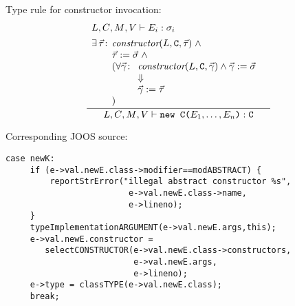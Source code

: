 \begin{slide*}
Type rule for constructor invocation:
\renewcommand{\arraystretch}{0.95}
$$ \frac{\begin{array}{l}
      \mbox{$L$}{},\mbox{$C$}{},\mbox{$M$}{},\mbox{$V$}{} \vdash E_i: \sigma_i\\[1ex]
      \exists\, \vec{\tau}\!:\!\!\begin{array}[t]{l}\mbox{\em constructor}(\mbox{$L$}{},\mbox{\tt C},\vec{\tau})\; \wedge\\
              \vec{\tau}:=\vec{\sigma}\; \wedge\\
              (\forall \vec{\gamma}\!:\begin{array}[t]{l}\mbox{\em constructor}(\mbox{$L$}{},\mbox{\tt C},\vec{\gamma}) \wedge \vec{\gamma}:=\vec{\sigma}\\
                       \Downarrow \\ \vec{\gamma}:=\vec{\tau}\end{array}\\)\end{array}\\
   \end{array}}{
       \mbox{$L$}{},\mbox{$C$}{},\mbox{$M$}{},\mbox{$V$}{} \vdash \mbox{\tt new C(}E_1,\ldots,E_n\mbox{\tt )}: \mbox{\tt C}
   }
$$
\renewcommand{\arraystretch}{1}

Corresponding JOOS source:

\begin{scriptsize}
\begin{verbatim}
case newK:
     if (e->val.newE.class->modifier==modABSTRACT) {
         reportStrError("illegal abstract constructor %s",
                         e->val.newE.class->name,
                         e->lineno);
     }
     typeImplementationARGUMENT(e->val.newE.args,this);
     e->val.newE.constructor = 
        selectCONSTRUCTOR(e->val.newE.class->constructors,
                          e->val.newE.args,
                          e->lineno);
     e->type = classTYPE(e->val.newE.class);
     break;

\end{verbatim}
\end{scriptsize}
\vfil
\end{slide*}

